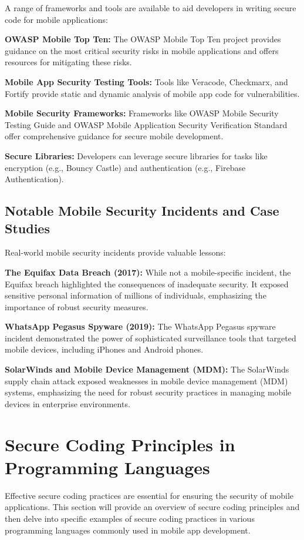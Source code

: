 \documentclass[conference]{IEEEtran}
\begin{document}
A range of frameworks and tools are available to aid developers in writing secure code for mobile applications:

\textbf{OWASP Mobile Top Ten:} The OWASP Mobile Top Ten project provides guidance on the most critical security risks in mobile applications and offers resources for mitigating these risks.

\textbf{Mobile App Security Testing Tools:} Tools like Veracode, Checkmarx, and Fortify provide static and dynamic analysis of mobile app code for vulnerabilities.

\textbf{Mobile Security Frameworks:} Frameworks like OWASP Mobile Security Testing Guide and OWASP Mobile Application Security Verification Standard offer comprehensive guidance for secure mobile development.

\textbf{Secure Libraries:} Developers can leverage secure libraries for tasks like encryption (e.g., Bouncy Castle) and authentication (e.g., Firebase Authentication).

\subsection{Notable Mobile Security Incidents and Case Studies}

Real-world mobile security incidents provide valuable lessons:

\textbf{The Equifax Data Breach (2017):} While not a mobile-specific incident, the Equifax breach highlighted the consequences of inadequate security. It exposed sensitive personal information of millions of individuals, emphasizing the importance of robust security measures.

\textbf{WhatsApp Pegasus Spyware (2019):} The WhatsApp Pegasus spyware incident demonstrated the power of sophisticated surveillance tools that targeted mobile devices, including iPhones and Android phones.

\textbf{SolarWinds and Mobile Device Management (MDM):} The SolarWinds supply chain attack exposed weaknesses in mobile device management (MDM) systems, emphasizing the need for robust security practices in managing mobile devices in enterprise environments.

\section{Secure Coding Principles in Programming Languages}

Effective secure coding practices are essential for ensuring the security of mobile applications. This section will provide an overview of secure coding principles and then delve into specific examples of secure coding practices in various programming languages commonly used in mobile app development.
\end{document}
